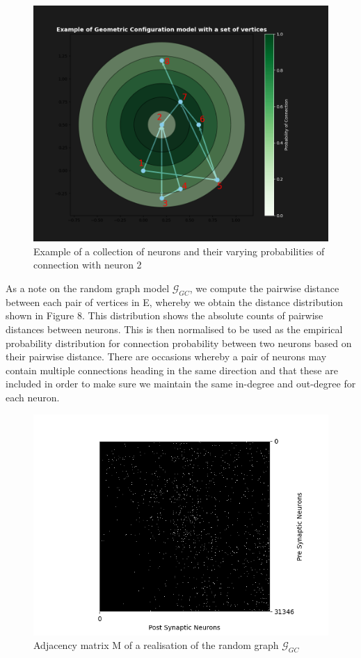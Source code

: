 \begin{figure}[H]
\begin{center}
\includegraphics[width=12cm]{GC/gc_example.png}
\caption{Example of a collection of neurons and their varying probabilities of connection with neuron 2}
\end{center}
\end{figure}
As a note on the random graph model $\mathcal{G}_{GC}$, we compute the pairwise distance between each pair of vertices in E, whereby we obtain the distance distribution shown in Figure 8. This distribution shows the absolute counts of pairwise distances between neurons. This is then normalised to be used as the empirical probability distribution for connection probability between two neurons based on their pairwise distance. 
There are occasions whereby a pair of neurons may contain multiple connections heading in the same direction and that these are included in order to make sure we maintain the same in-degree and out-degree for each neuron.
\begin{figure}[H]
\begin{center}
\captionsetup{justification=centering}
\includegraphics[width=12cm]{GC/matrix_GC.png}
\caption{Adjacency matrix M of a realisation of the random graph $\mathcal{G}_{GC}$}
\end{center}
\end{figure}

